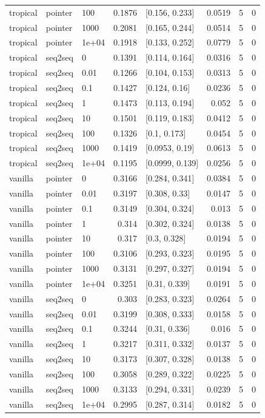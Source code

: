 \documentclass[10pt]{article}
\begin{document}
{\begin{longtable}{lllrlrrr}
tropical & pointer & 100 & 0.1876 & [0.156, 0.233] & 0.0519 & 5 & 0\\
tropical & pointer & 1000 & 0.2081 & [0.165, 0.244] & 0.0514 & 5 & 0\\
tropical & pointer & 1e+04 & 0.1918 & [0.133, 0.252] & 0.0779 & 5 & 0\\
tropical & seq2seq & 0 & 0.1391 & [0.114, 0.164] & 0.0316 & 5 & 0\\
tropical & seq2seq & 0.01 & 0.1266 & [0.104, 0.153] & 0.0313 & 5 & 0\\
tropical & seq2seq & 0.1 & 0.1427 & [0.124, 0.16] & 0.0236 & 5 & 0\\
tropical & seq2seq & 1 & 0.1473 & [0.113, 0.194] & 0.052 & 5 & 0\\
tropical & seq2seq & 10 & 0.1501 & [0.119, 0.183] & 0.0412 & 5 & 0\\
tropical & seq2seq & 100 & 0.1326 & [0.1, 0.173] & 0.0454 & 5 & 0\\
tropical & seq2seq & 1000 & 0.1419 & [0.0953, 0.19] & 0.0613 & 5 & 0\\
tropical & seq2seq & 1e+04 & 0.1195 & [0.0999, 0.139] & 0.0256 & 5 & 0\\
vanilla & pointer & 0 & 0.3166 & [0.284, 0.341] & 0.0384 & 5 & 0\\
vanilla & pointer & 0.01 & 0.3197 & [0.308, 0.33] & 0.0147 & 5 & 0\\
vanilla & pointer & 0.1 & 0.3149 & [0.304, 0.324] & 0.013 & 5 & 0\\
vanilla & pointer & 1 & 0.314 & [0.302, 0.324] & 0.0138 & 5 & 0\\
vanilla & pointer & 10 & 0.317 & [0.3, 0.328] & 0.0194 & 5 & 0\\
vanilla & pointer & 100 & 0.3106 & [0.293, 0.323] & 0.0195 & 5 & 0\\
vanilla & pointer & 1000 & 0.3131 & [0.297, 0.327] & 0.0194 & 5 & 0\\
vanilla & pointer & 1e+04 & 0.3251 & [0.31, 0.339] & 0.0191 & 5 & 0\\
vanilla & seq2seq & 0 & 0.303 & [0.283, 0.323] & 0.0264 & 5 & 0\\
vanilla & seq2seq & 0.01 & 0.3199 & [0.308, 0.333] & 0.0158 & 5 & 0\\
vanilla & seq2seq & 0.1 & 0.3244 & [0.31, 0.336] & 0.016 & 5 & 0\\
vanilla & seq2seq & 1 & 0.3217 & [0.311, 0.332] & 0.0137 & 5 & 0\\
vanilla & seq2seq & 10 & 0.3173 & [0.307, 0.328] & 0.0138 & 5 & 0\\
vanilla & seq2seq & 100 & 0.3058 & [0.289, 0.322] & 0.0225 & 5 & 0\\
vanilla & seq2seq & 1000 & 0.3133 & [0.294, 0.331] & 0.0239 & 5 & 0\\
vanilla & seq2seq & 1e+04 & 0.2995 & [0.287, 0.314] & 0.0182 & 5 & 0\\
\bottomrule
\end{longtable}
}
\end{document}
